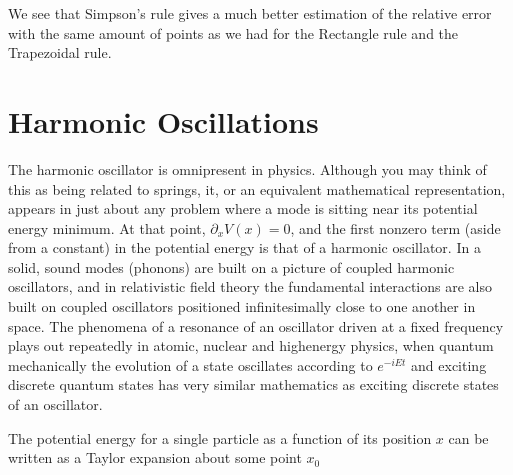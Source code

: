 \documentclass[letterpaper,10pt,english]{sphinxmanual}
\begin{document}
We see that Simpson’s rule gives a much better estimation of the relative error with the same amount of points as we had for the Rectangle rule and the Trapezoidal rule.


\chapter{Harmonic Oscillations}
\label{\detokenize{chapter1:harmonic-oscillations}}
The harmonic oscillator is omnipresent in physics. Although you may think
of this as being related to springs, it, or an equivalent
mathematical representation, appears in just about any problem where a
mode is sitting near its potential energy minimum. At that point,
\(\partial_x V(x)=0\), and the first non\sphinxhyphen{}zero term (aside from a
constant) in the potential energy is that of a harmonic oscillator. In
a solid, sound modes (phonons) are built on a picture of coupled
harmonic oscillators, and in relativistic field theory the fundamental
interactions are also built on coupled oscillators positioned
infinitesimally close to one another in space. The phenomena of a
resonance of an oscillator driven at a fixed frequency plays out
repeatedly in atomic, nuclear and high\sphinxhyphen{}energy physics, when quantum
mechanically the evolution of a state oscillates according to
\(e^{-iEt}\) and exciting discrete quantum states has very similar
mathematics as exciting discrete states of an oscillator.

The potential energy for a single particle as a function of its position \(x\) can be written as a Taylor expansion about some point \(x_0\)
\end{document}
